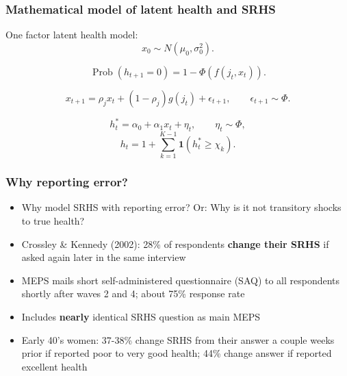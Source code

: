 \documentclass[aspectratio=169]{beamer}
\newcommand{\Prob}{\operatorname{Prob}}
\begin{document}
\begin{frame}\frametitle{Mathematical model of latent health and SRHS}
One factor latent health model:
\setcounter{equation}{0}
\begin{equation}
x_0 \sim N(\mu_0, \sigma^2_0).
\end{equation}

\begin{equation}
\Prob(h_{t+1} = 0) = 1 - \Phi(f(j_t,x_t)).
\end{equation}

\begin{equation}
x_{t+1} = \rho_{j} x_t + (1-\rho_j)g(j_t) + \epsilon_{t+1}, \qquad \epsilon_{t+1} \sim \Phi.
\end{equation}

\begin{equation}
h^*_t = \alpha_0 + \alpha_1 x_t + \eta_t, \qquad \eta_t \sim \Phi,
\end{equation}
\begin{equation*}
h_t = 1 + \sum_{k = 1}^{K-1} \mathbf{1}(h^*_t \geq \chi_k). 
\end{equation*}
\end{frame}


\begin{frame}\frametitle{Why reporting error?}
\begin{itemize}
	\item <1->Why model SRHS with reporting error?  Or: Why is it not transitory shocks to true health?
	
	\item <2->Crossley \& Kennedy (2002): 28\% of respondents \textbf{change their SRHS} if asked again later in the same interview
	
	\item <3->MEPS mails short self-administered questionnaire (SAQ) to all respondents shortly after waves 2 and 4; about 75\% response rate
	
	\item <3->Includes \textbf{nearly} identical SRHS question as main MEPS
	
	\item <4->Early 40's women: 37-38\% change SRHS from their answer a couple weeks prior if reported poor to very good health; 44\% change answer if reported excellent health
\end{itemize}
\end{frame}
\end{document}

